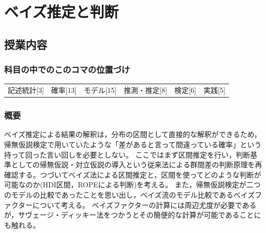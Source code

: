 \section{ベイズ推定と判断}
\label{s27_bayesian3}

\subsection{授業内容}
\subsubsection{科目の中でのこのコマの位置づけ}
\begin{tabular}[t]{cccccc}
	記述統計[3] & 確率[13] & モデル[15] & 推測・推定[8] & 検定[6] & 実践[5]
\end{tabular}

\subsubsection{概要}
ベイズ推定による結果の解釈は，分布の区間として直接的な解釈ができるため，帰無仮説検定で用いていたような「差があると言って間違っている確率」という持って回った言い回しを必要としない。
ここではまず区間推定を行い，判断基準としての帰無仮説・対立仮説の導入という従来法による群間差の判断原理を再確認する。つづいてベイズ法による区間推定と，区間を使ってどのような判断が可能なのか(HDI区間，ROPEによる判断)を考える。
また，帰無仮説検定が二つのモデルの比較であったことを思い出し，ベイズ流のモデル比較であるベイズファクターについて考える。
ベイズファクターの計算には周辺尤度が必要であるが，サヴェージ・ディッキー法をつかうとその簡便的な計算が可能であることにも触れる。

